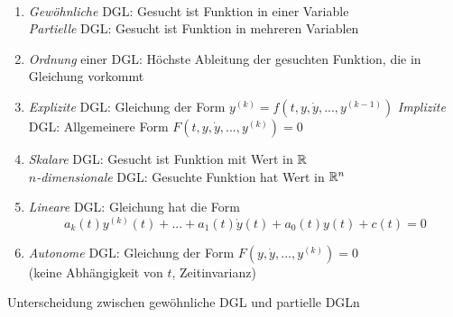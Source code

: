 \documentclass{cheat-sheet}
\begin{document}
\fi




\begin{defn}\mbox{}\\
  \begin{enumerate}[label=(\Roman*),leftmargin=2em]
    \item \emph{Gewöhnliche} DGL: Gesucht ist Funktion in einer Variable\\
    \emph{Partielle} DGL: Gesucht ist Funktion in mehreren Variablen
    \item \emph{Ordnung} einer DGL: Höchste Ableitung der gesuchten Funktion, die in Gleichung vorkommt
    \item \emph{Explizite} DGL: Gleichung der Form
    $y^{(k)} {=} f(t, y, \dot{y}, ..., y^{(k{-}1)})$
    \emph{Implizite} DGL: Allgemeinere Form $F(t, y, \dot{y}, ..., y^{(k)}) = 0$
    \item \emph{Skalare} DGL: Gesucht ist Funktion mit Wert in $\mathbb{R}$\\
    \emph{$n$-dimensionale} DGL: Gesuchte Funktion hat Wert in $\mathbb{R}^n$
    \item \emph{Lineare} DGL: Gleichung hat die Form
    \[ a_k(t) y^{(k)}(t) + ... + a_1(t) \dot{y}(t) + a_0(t)y(t) + c(t) = 0 \]
    \item \emph{Autonome} DGL: Gleichung der Form $F(y, \dot{y}, ..., y^{(k)}) = 0$\\
    (keine Abhängigkeit von $t$, Zeitinvarianz)
  \end{enumerate}
\end{defn}

\iffalse

Unterscheidung zwischen gewöhnliche DGL und partielle DGLn
\end{document}
